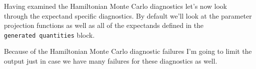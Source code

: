 \documentclass[
  letterpaper,
  DIV=11,
  numbers=noendperiod]{scrartcl}
\newenvironment{Shaded}{\begin{snugshade}}{\end{snugshade}}
\newcommand{\FunctionTok}[1]{\textcolor[rgb]{0.28,0.35,0.67}{#1}}
\newcommand{\NormalTok}[1]{\textcolor[rgb]{0.00,0.23,0.31}{#1}}
\newcommand{\SpecialCharTok}[1]{\textcolor[rgb]{0.37,0.37,0.37}{#1}}
\begin{document}
Having examined the Hamiltonian Monte Carlo diagnostics let's now look
through the expectand specific diagnostics. By default we'll look at the
parameter projection functions as well as all of the expectands defined
in the \texttt{generated\ quantities} block.

Because of the Hamiltonian Monte Carlo diagnostic failures I'm going to
limit the output just in case we have many failures for these
diagnostics as well.

\begin{Shaded}
\end{Shaded}
\end{document}
